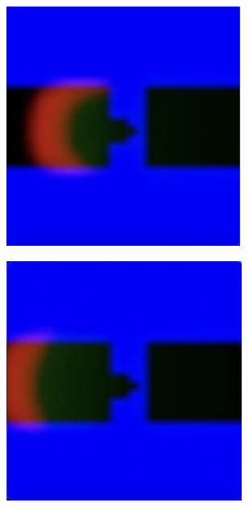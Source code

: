 \begin{figure}
\begin{subfigure}{0.24\textwidth}
	\end{subfigure}
    \begin{subfigure}{0.24\textwidth}
		\includegraphics[width=\linewidth]{diode/easy/Screenshot 2024-03-09 at 16.22.35.png} 
	\end{subfigure}
    \begin{subfigure}{0.24\textwidth}
		\includegraphics[width=\linewidth]{diode/easy/Screenshot 2024-03-09 at 16.22.45.png} 
	\end{subfigure}


\end{figure}
